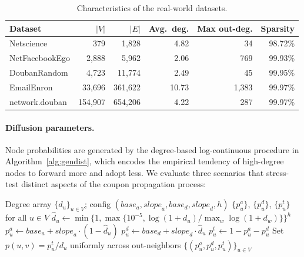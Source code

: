 \documentclass[sigconf]{acmart}
\begin{document}
\begin{table}[t]
  \caption{Characteristics of the real-world datasets.}
  \label{tab:datasets}
  \centering
  \begin{tabular}{lrrrrr}
    \toprule
    Dataset         & $|V|$   & $|E|$     & Avg.\ deg. & Max out-deg. & Sparsity \\
    \midrule
    Netscience      & 379     & 1,828     & 4.82       & 34           & 98.72\% \\
    NetFacebookEgo  & 2,888   & 5,962     & 2.06       & 769          & 99.93\% \\
    DoubanRandom    & 4,723   & 11,774    & 2.49       & 45           & 99.95\% \\
    EmailEnron      & 33,696  & 361,622   & 10.73      & 1,383        & 99.97\% \\
    network.douban  & 154,907 & 654,206   & 4.22       & 287          & 99.97\% \\
    \bottomrule
  \end{tabular}
\end{table}

\paragraph{Diffusion parameters.}
Node probabilities are generated by the degree-based log-continuous procedure in Algorithm~\ref{alg:gendist}, which encodes the empirical tendency of high-degree nodes to forward more and adopt less. We evaluate three scenarios that stress-test distinct aspects of the coupon propagation process:

\begin{algorithm}[t]
\caption{Generate Degree-Based Node Probability Distributions}
\label{alg:gendist}
\begin{algorithmic}[1]
\Require Degree array $\{d_u\}_{u\in V}$; config $(\textit{base}_a, \textit{slope}_a, \textit{base}_d, \textit{slope}_d, h)$
\Ensure $\{p_u^a\}$, $\{p_u^d\}$, $\{p_u^t\}$ for all $u\in V$
  \State $\hat{d}_u \leftarrow \min\!\bigl\{1,\max\{10^{-5}, \log(1+d_u)/\max_w\log(1+d_w)\}\bigr\}^h$
\EndFor
{}
  \State $p_u^a \leftarrow \textit{base}_a + \textit{slope}_a \cdot (1 - \hat{d}_u)$
  \State $p_u^d \leftarrow \textit{base}_d + \textit{slope}_d \cdot \hat{d}_u$
  \State $p_u^t \leftarrow 1 - p_u^a - p_u^d$
\EndFor
\State Set $p(u,v) = p_u^t / d_u$ uniformly across out-neighbors
\State \Return $\{(p_u^a, p_u^d, p_u^t)\}_{u\in V}$
\end{algorithmic}
\end{algorithm}
\end{document}
